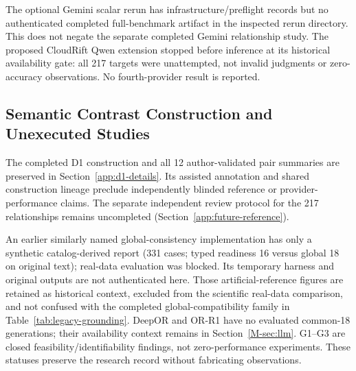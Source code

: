 The optional Gemini scalar rerun has infrastructure/preflight records but no authenticated completed full-benchmark artifact in the inspected rerun directory. This does not negate the separate completed Gemini relationship study. The proposed CloudRift Qwen extension stopped before inference at its historical availability gate: all 217 targets were unattempted, not invalid judgments or zero-accuracy observations. No fourth-provider result is reported.

\subsection{Semantic Contrast Construction and Unexecuted Studies}
The completed D1 construction and all 12 author-validated pair summaries are preserved in Section~\ref{app:d1-details}. Its assisted annotation and shared construction lineage preclude independently blinded reference or provider-performance claims. The separate independent review protocol for the 217 relationships remains uncompleted (Section~\ref{app:future-reference}).

An earlier similarly named global-consistency implementation has only a synthetic catalog-derived report (331 cases; typed readiness 16 versus global 18 on original text); real-data evaluation was blocked. Its temporary harness and original outputs are not authenticated here. Those artificial-reference figures are retained as historical context, excluded from the scientific real-data comparison, and not confused with the completed global-compatibility family in Table~\ref{tab:legacy-grounding}. DeepOR and OR-R1 have no evaluated common-18 generations; their availability context remains in Section~\ref{M-sec:llm}. G1--G3 are closed feasibility/identifiability findings, not zero-performance experiments. These statuses preserve the research record without fabricating observations.
